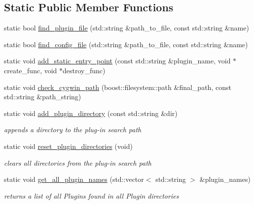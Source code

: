 \subsection*{Static Public Member Functions}
\begin{DoxyCompactItemize}
\item 
static bool \hyperlink{classpion_1_1plugin_a8bded1e5b0c6e5008fb62613bf7bed63}{find\-\_\-plugin\-\_\-file} (std\-::string \&path\-\_\-to\-\_\-file, const std\-::string \&name)
\item 
static bool \hyperlink{classpion_1_1plugin_a885fb365fc2fedf251853eb949fcf38a}{find\-\_\-config\-\_\-file} (std\-::string \&path\-\_\-to\-\_\-file, const std\-::string \&name)
\item 
static void \hyperlink{classpion_1_1plugin_a7f070e7afa7b82ee9da454495ee7d659}{add\-\_\-static\-\_\-entry\-\_\-point} (const std\-::string \&plugin\-\_\-name, void $\ast$create\-\_\-func, void $\ast$destroy\-\_\-func)
\item 
static void \hyperlink{classpion_1_1plugin_a424890d78c0e7fe566043b75016bf738}{check\-\_\-cygwin\-\_\-path} (boost\-::filesystem\-::path \&final\-\_\-path, const std\-::string \&path\-\_\-string)
\item 
static void \hyperlink{classpion_1_1plugin_aed4ab06e4aa42456df83e4e3e120dda5}{add\-\_\-plugin\-\_\-directory} (const std\-::string \&dir)
\begin{DoxyCompactList}\small\item\em appends a directory to the plug-\/in search path \end{DoxyCompactList}\item 
static void \hyperlink{classpion_1_1plugin_a797d2923f9495109290755625070f93e}{reset\-\_\-plugin\-\_\-directories} (void)
\begin{DoxyCompactList}\small\item\em clears all directories from the plug-\/in search path \end{DoxyCompactList}\item 
static void \hyperlink{classpion_1_1plugin_add067f91834b99ad73d2ec448aebe33b}{get\-\_\-all\-\_\-plugin\-\_\-names} (std\-::vector$<$ std\-::string $>$ \&plugin\-\_\-names)
\begin{DoxyCompactList}\small\item\em returns a list of all Plugins found in all Plugin directories \end{DoxyCompactList}\end{DoxyCompactItemize}
